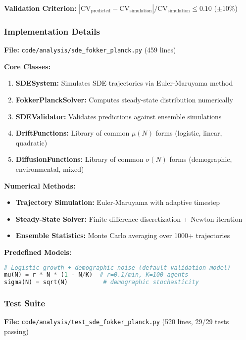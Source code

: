 \documentclass[11pt]{article}
\newcommand{\cv}{\text{CV}}
\begin{document}
\textbf{Validation Criterion:} $|\cv_{\text{predicted}} - \cv_{\text{simulation}}| / \cv_{\text{simulation}} \leq 0.10$ ($\pm$10\%)

\subsubsection{Implementation Details}

\textbf{File:} \texttt{code/analysis/sde\_fokker\_planck.py} (459 lines)

\textbf{Core Classes:}
\begin{enumerate}
\item \textbf{SDESystem:} Simulates SDE trajectories via Euler-Maruyama method
\item \textbf{FokkerPlanckSolver:} Computes steady-state distribution numerically
\item \textbf{SDEValidator:} Validates predictions against ensemble simulations
\item \textbf{DriftFunctions:} Library of common $\mu(N)$ forms (logistic, linear, quadratic)
\item \textbf{DiffusionFunctions:} Library of common $\sigma(N)$ forms (demographic, environmental, mixed)
\end{enumerate}

\textbf{Numerical Methods:}
\begin{itemize}
\item \textbf{Trajectory Simulation:} Euler-Maruyama with adaptive timestep
\item \textbf{Steady-State Solver:} Finite difference discretization + Newton iteration
\item \textbf{Ensemble Statistics:} Monte Carlo averaging over 1000+ trajectories
\end{itemize}

\textbf{Predefined Models:}
\begin{lstlisting}[language=Python]
# Logistic growth + demographic noise (default validation model)
mu(N) = r * N * (1 - N/K)  # r=0.1/min, K=100 agents
sigma(N) = sqrt(N)          # demographic stochasticity
\end{lstlisting}

\subsubsection{Test Suite}

\textbf{File:} \texttt{code/analysis/test\_sde\_fokker\_planck.py} (520 lines, 29/29 tests passing)
\end{document}
